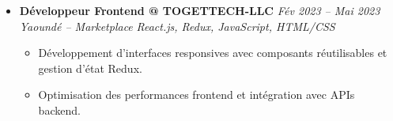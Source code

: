 \documentclass[a4paper,11pt]{article}
\begin{document}
\begin{itemize}[leftmargin=*, label={-}]
\item \textbf{Développeur Frontend @ TOGETTECH-LLC} \hfill \textit{Fév 2023 -- Mai 2023} \\
\textit{Yaoundé -- Marketplace} \hfill \textit{React.js, Redux, JavaScript, HTML/CSS}
\vspace{-2pt}
    \begin{itemize}[leftmargin=0.4cm, nosep, label=\tiny$\bullet$]
        \item \small{Développement d'interfaces responsives avec composants réutilisables et gestion d'état Redux.}
        \item \small{Optimisation des performances frontend et intégration avec APIs backend.}
    \end{itemize}
\vspace{3pt}

\end{itemize}

\end{document}

